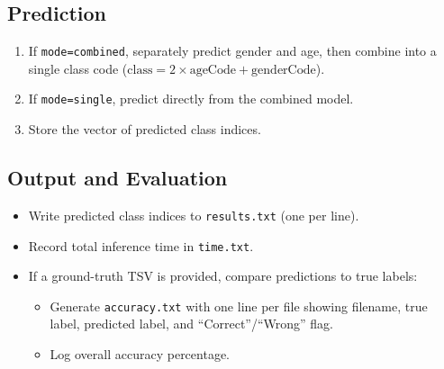 \documentclass[a4paper,12pt]{article}
\begin{document}
\subsection{Prediction}
\begin{enumerate}
  \item If \texttt{mode=combined}, separately predict gender and age, then combine into a single class code (\( \text{class} = 2 \times \text{ageCode} + \text{genderCode}\)).
  \item If \texttt{mode=single}, predict directly from the combined model.
  \item Store the vector of predicted class indices.
\end{enumerate}

\subsection{Output and Evaluation}
\begin{itemize}
  \item Write predicted class indices to \texttt{results.txt} (one per line).
  \item Record total inference time in \texttt{time.txt}.
  \item If a ground-truth TSV is provided, compare predictions to true labels:
    \begin{itemize}
      \item Generate \texttt{accuracy.txt} with one line per file showing filename, true label, predicted label, and “Correct”/“Wrong” flag.
      \item Log overall accuracy percentage.
    \end{itemize}
\end{itemize}
\end{document}
